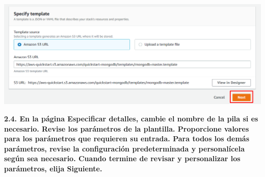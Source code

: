 \documentclass{article}
\begin{document}
    \begin{center}
		\includegraphics[width=15cm]{./images/8} 
	\end{center}
\newpage
\textbf{2.4. En la página Especificar detalles, cambie el nombre de la pila si es necesario. Revise los parámetros de la plantilla. Proporcione valores para los parámetros que requieren su entrada. Para todos los demás parámetros, revise la configuración predeterminada y personalícela según sea necesario. Cuando termine de revisar y personalizar los parámetros, elija Siguiente.
}
\end{document}
